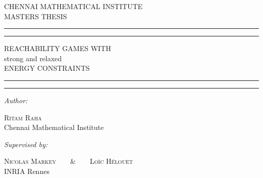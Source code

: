 \documentclass[a4paper, 12pt, twoside]{book}
\theoremstyle{definition}
\begin{document}
\begin{titlepage}
	\centering
	\scshape 
	{\LARGE{CHENNAI MATHEMATICAL INSTITUTE}}\\
          \vskip 0.5cm
	MASTERS THESIS
	\vspace*{\baselineskip} 
	
	\rule{\textwidth}{1.6pt}\vspace*{-\baselineskip}\vspace*{2pt}
	\rule{\textwidth}{0.4pt} 

	\vspace{0.75\baselineskip}
	
	{\LARGE REACHABILITY GAMES WITH\\ strong and relaxed \\ ENERGY CONSTRAINTS\\} 
	
	\vspace{0.75\baselineskip} 
	
	\rule{\textwidth}{0.4pt}\vspace*{-\baselineskip}\vspace{3.2pt} 
	\rule{\textwidth}{1.6pt}
	
	\vspace{2\baselineskip} 
	
	
	
	
	\textit{Author:}
	
	\vspace{0.5\baselineskip} 
	
	{\scshape\Large Ritam Raha}\\ %
	\vspace{0.2\baselineskip}
	{\small Chennai Mathematical Institute}
	\vspace{2\baselineskip} 

		
	\textit{Supervised by:}     
	\vspace{0.5\baselineskip}

	{\scshape\Large Nicolas Markey}\ \ \ \ \&\ \ \ \  {\scshape\Large Loïc Hélouët}\\ %
	\vspace{0.2\baselineskip}
	{\small INRIA Rennes}
	\vspace{2\baselineskip}

	\vspace{2\baselineskip} 
	

\end{titlepage}
\end{document}
